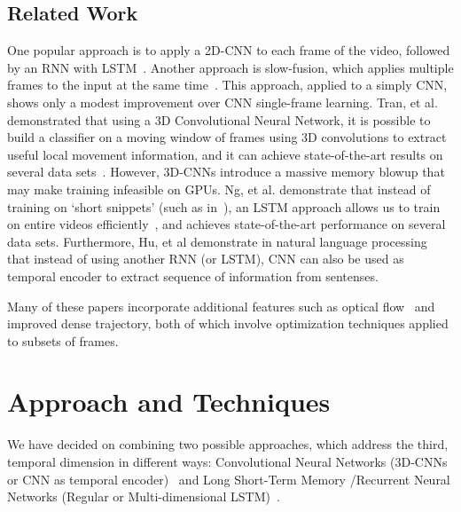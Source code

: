 \subsection{Related Work}
One popular approach is to apply a 2D-CNN to each frame of the video, followed by an RNN with LSTM~\cite{ltrcn}. 
Another approach is slow-fusion, which applies multiple frames to the input at the same time~\cite{cnnvid}. This approach, applied to a simply CNN, shows only a modest improvement over CNN single-frame learning.
Tran, et al. demonstrated that using a 3D Convolutional Neural Network, it is possible to build a classifier on a moving window of frames using 3D convolutions to extract useful local movement information, and it can achieve state-of-the-art results on several data sets~\cite{stf}. However, 3D-CNNs introduce a massive memory blowup that may make training infeasible on GPUs.
Ng, et al. demonstrate that instead of training on `short snippets' (such as in~\cite{cnnvid,stf}), an LSTM approach allows us to train on entire videos efficiently~\cite{snip}, and achieves state-of-the-art performance on several data sets. Furthermore, Hu, et al \cite{cnnMNLS} demonstrate in natural language processing that instead of using another RNN (or LSTM), CNN can also be used as temporal encoder to extract sequence of information from sentenses. 

Many of these papers incorporate additional features such as optical flow~\cite{brox} and improved dense trajectory, both of which involve optimization techniques applied to subsets of frames. 
\section{Approach and Techniques}
We have decided on combining two possible approaches, which address
the third, temporal dimension in different ways: Convolutional Neural
Networks (3D-CNNs or CNN as temporal encoder)~\cite{stf,cnnvid,cnnMNLS} and Long
Short-Term Memory /Recurrent Neural Networks (Regular or Multi-dimensional LSTM)~\cite{ltrcn}. 

